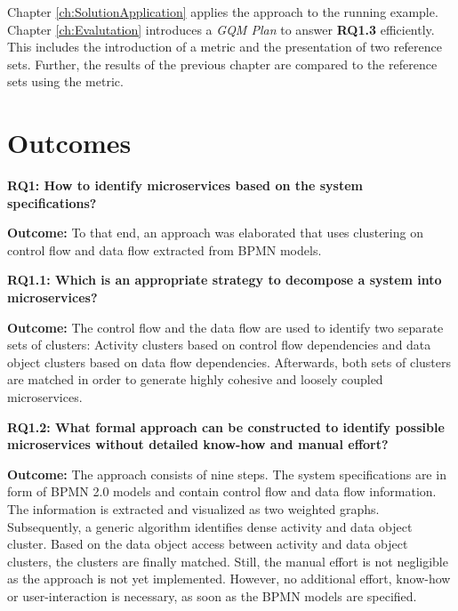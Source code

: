 Chapter \ref{ch:SolutionApplication} applies the approach to the running example. Chapter \ref{ch:Evalutation} introduces a \textit{GQM Plan} to answer \textbf{RQ1.3} efficiently. This includes the introduction of a metric and the presentation of two reference sets. Further, the results of the previous chapter are compared to the reference sets using the metric.


\section{Outcomes}


\vspace{0.5cm}
\par
\begingroup

\noindent
\textbf{RQ1: How to identify microservices based on the system specifications? }

\vspace{0.3cm}
\noindent
\textbf{Outcome:} To that end, an approach was elaborated that uses clustering on control flow and data flow extracted from BPMN models.

\endgroup
\vspace{0.5cm}


\vspace{0.5cm}
\par
\begingroup

\noindent
\textbf{RQ1.1: Which is an appropriate strategy to decompose a system into microservices? }

\vspace{0.3cm}
\noindent
\textbf{Outcome:} The control flow and the data flow are used to identify two separate sets of clusters: Activity clusters based on control flow dependencies and data object clusters based on data flow dependencies. Afterwards, both sets of clusters are matched in order to generate highly cohesive and loosely coupled microservices. 

\endgroup
\vspace{0.5cm}

\vspace{0.5cm}
\par
\begingroup

\noindent
\textbf{RQ1.2: What formal approach can be constructed to identify possible microservices without detailed know-how and manual effort? }

\vspace{0.3cm}
\noindent
\textbf{Outcome:} The approach consists of nine steps. The system specifications are in form of BPMN 2.0 models and contain control flow and data flow information. The information is extracted and visualized as two weighted graphs. Subsequently, a generic algorithm identifies dense activity and data object cluster. Based on the data object access between activity and data object clusters, the clusters are finally matched. Still, the manual effort is not negligible as the approach is not yet implemented. However, no additional effort, know-how or user-interaction is necessary, as soon as the BPMN models are specified. 



